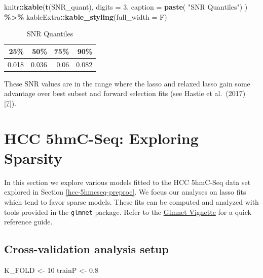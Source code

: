 \documentclass[
]{book}
\newenvironment{Shaded}{\begin{snugshade}}{\end{snugshade}}
\newcommand{\DataTypeTok}[1]{\textcolor[rgb]{0.13,0.29,0.53}{#1}}
\newcommand{\DecValTok}[1]{\textcolor[rgb]{0.00,0.00,0.81}{#1}}
\newcommand{\FloatTok}[1]{\textcolor[rgb]{0.00,0.00,0.81}{#1}}
\newcommand{\KeywordTok}[1]{\textcolor[rgb]{0.13,0.29,0.53}{\textbf{#1}}}
\newcommand{\NormalTok}[1]{#1}
\newcommand{\OperatorTok}[1]{\textcolor[rgb]{0.81,0.36,0.00}{\textbf{#1}}}
\newcommand{\StringTok}[1]{\textcolor[rgb]{0.31,0.60,0.02}{#1}}
\begin{document}
\begin{Shaded}
\begin{Highlighting}[]
\NormalTok{knitr}\OperatorTok{::}\KeywordTok{kable}\NormalTok{(}\KeywordTok{t}\NormalTok{(SNR\_quant),}
  \DataTypeTok{digits =} \DecValTok{3}\NormalTok{,}
  \DataTypeTok{caption =} \KeywordTok{paste}\NormalTok{(}
    \StringTok{"SNR Quantiles"}\NormalTok{) }
\NormalTok{) }\OperatorTok{\%>\%}\StringTok{ }\NormalTok{kableExtra}\OperatorTok{::}\KeywordTok{kable\_styling}\NormalTok{(}\DataTypeTok{full\_width =}\NormalTok{ F)}
\end{Highlighting}
\end{Shaded}

\begin{table}

\caption{\label{tab:hcc5hmC-preproc-plotSNR}SNR Quantiles}
\centering
\begin{tabular}[t]{r|r|r|r}
\hline
25\% & 50\% & 75\% & 90\%\\
\hline
0.018 & 0.036 & 0.06 & 0.082\\
\hline
\end{tabular}
\end{table}

These SNR values are in the range where the lasso and relaxed lasso gain some advantage over
best subset and forward selection fits (see Hastie et al.~(2017) {[}\protect\hyperlink{ref-Hastie:2017aa}{7}{]}).

\hypertarget{hcc-5hmcseq-explore-sparsity}{%
\chapter{HCC 5hmC-Seq: Exploring Sparsity}\label{hcc-5hmcseq-explore-sparsity}}

In this section we explore various models fitted to
the HCC 5hmC-Seq data set explored in Section \ref{hcc-5hmcseq-preproc}.
We focus our analyses on lasso fits which tend to favor sparse models.
These fits can be computed and analyzed with tools provided in the \texttt{glmnet} package.
Refer to the \href{https://web.stanford.edu/~hastie/glmnet/glmnet_alpha.html}{Glmnet Vignette}
for a quick reference guide.

\hypertarget{cross-validation-analysis-setup}{%
\section{Cross-validation analysis setup}\label{cross-validation-analysis-setup}}

\begin{Shaded}
\begin{Highlighting}[]
\NormalTok{K\_FOLD <{-}}\StringTok{ }\DecValTok{10}
\NormalTok{trainP <{-}}\StringTok{ }\FloatTok{0.8}
\end{Highlighting}
\end{Shaded}
\end{document}
